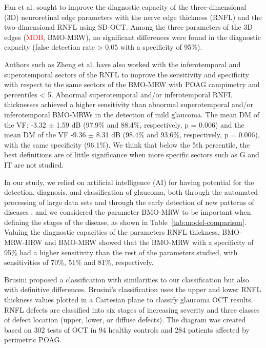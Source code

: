 \documentclass[fleqn,10pt]{wlscirep}
\begin{document}
Fan et al. \cite{fan:2017:enhanced} sought to improve the diagnostic capacity of the three-dimensional (3D) neuroretinal edge parameters with the nerve edge thickness (RNFL) and the two-dimensional RNFL using SD-OCT. Among the three parameters of the 3D edges (\textcolor{red}{MDB}, BMO-MRW), no significant differences were found in the diagnostic capacity (false detection rate > 0.05 with a specificity of 95\%).

Authors such as Zheng et al. \cite{zheng:2019:diagnostic} have also worked with the inferotemporal and superotemporal sectors of the RNFL to improve the sensitivity and specificity with respect to the same sectors of the BMO-MRW with POAG campimetry and percentiles < 5. Abnormal superotemporal and/or inferotemporal RNFL thicknesses achieved a higher sensitivity than abnormal superotemporal and/or inferotemporal BMO-MRWs in the detection of mild glaucoma. The mean DM of the VF: -3.32 $\pm$ 1.59 dB (97.9\% and 88.4\%, respectively, p = 0.006) and the mean DM of the VF -9.36 $\pm$ 8.31 dB (98.4\% and 93.6\%, respectively, p = 0.006), with the same specificity (96.1\%). We think that below the 5th percentile, the best definitions are of little significance when more specific sectors such as G and IT are not studied.

In our study, we relied on artificial intelligence (AI) for having potential for the detection, diagnosis, and classification of glaucoma, both through the automated processing of large data sets and through the early detection of new patterns of diseases \cite{zheng:2019:artificial}, and we considered the parameter BMO-MRW to be important when defining the stages of the disease, as shown in Table~\ref{tab:model-comparison}.\cite{chauhan:2013:enhanced} Valuing the diagnostic capacities of the parameters RNFL thickness, BMO-MRW-HRW and BMO-MRW showed that the BMO-MRW with a specificity of 95\% had a higher sensitivity than the rest of the parameters studied, with sensitivities of 70\%, 51\% and 81\%, respectively.

Brusini \cite{brusini:2018:glaucoma} proposed a classification with similarities to our classification but also with definitive differences. Brusini’s classification uses the upper and lower RNFL thickness values plotted in a Cartesian plane to classify glaucoma OCT results. RNFL defects are classified into six stages of increasing severity and three classes of defect location (upper, lower, or diffuse defects). The diagram was created based on 302 tests of OCT in 94 healthy controls and 284 patients affected by perimetric POAG.
\end{document}
